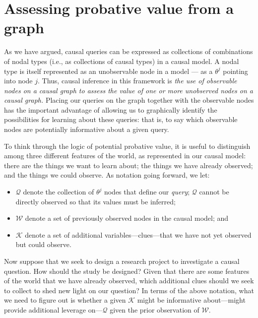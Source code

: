 \documentclass[
  12pt,
]{book}
\providecommand{\tightlist}{%
  \setlength{\itemsep}{0pt}\setlength{\parskip}{0pt}}
\begin{document}
\hypertarget{assessing-probative-value-from-a-graph}{%
\section{Assessing probative value from a graph}\label{assessing-probative-value-from-a-graph}}

As we have argued, causal queries can be expressed as collections of combinations of nodal types (i.e., as collections of causal types) in a causal model. A nodal type is itself represented as an unobservable node in a model --- as a \(\theta^j\) pointing into node \(j\). Thus, causal inference in this framework is \emph{the use of observable nodes on a causal graph to assess the value of one or more unobserved nodes on a causal graph.} Placing our queries on the graph together with the observable nodes has the important advantage of allowing us to graphically identify the possibilities for learning about these queries: that is, to say which observable nodes are potentially informative about a given query.

To think through the logic of potential probative value, it is useful to distinguish among three different features of the world, as represented in our causal model: there are the things we want to learn about; the things we have already observed; and the things we could observe. As notation going forward, we let:

\begin{itemize}
\tightlist
\item
  \(\mathcal Q\) denote the collection of \(\theta^j\) nodes that define our \emph{query}; \(\mathcal Q\) cannot be directly observed so that its values must be inferred;
\item
  \(\mathcal W\) denote a set of previously observed nodes in the causal model; and
\item
  \(\mathcal K\) denote a set of additional variables---clues---that we have not yet observed but could observe.
\end{itemize}

Now suppose that we seek to design a research project to investigate a causal question. How should the study be designed? Given that there are some features of the world that we have already observed, which additional clues should we seek to collect to shed new light on our question? In terms of the above notation, what we need to figure out is whether a given \(\mathcal K\) might be informative about---might provide additional leverage on---\(\mathcal Q\) given the prior observation of \(\mathcal W\).
\end{document}
